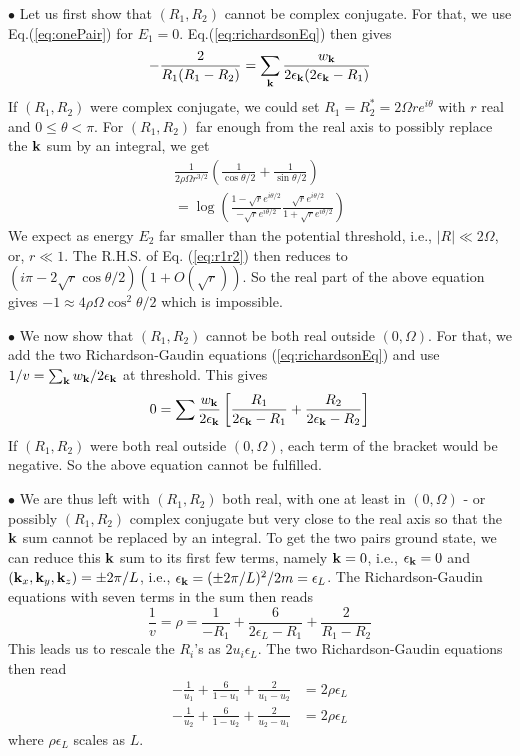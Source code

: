 \documentclass[5p,twocolumn]{elsarticle}
\begin{document}
$\bullet$ Let us first show that $(R_1,R_2)$ cannot be complex conjugate. For that, we use Eq.(\ref{eq:onePair}) for $E_1=0$. Eq.(\ref{eq:richardsonEq}) then gives
\begin{equation}
-\frac{2}{R_{1}(R_{1}-R_{2})}=\sum_{\mathbf{k}}\frac{w_{\mathbf{k}}}{2\epsilon_{\mathbf{k}}(2\epsilon_{\mathbf{k}}-R_{1})}
\end{equation}
If $(R_1,R_2)$ were complex conjugate, we could set $R_1=R^*_2=2 \Omega r e^{i\theta}$ with $r$ real and $0\leqslant\theta<\pi$. For $(R_1,R_2)$ far enough from the real axis to possibly replace the $\mathbf{k}$ sum by an integral, we get
\begin{multline}\label{eq:r1r2}
\frac{1}{2\rho\Omega{r^{3/2}}}\left(\frac{1}{\cos\theta/2}+\frac{1}{\sin\theta/2}\right)\\
=\log\left(\frac{1-\sqrt{r}e^{i\theta/2}}{-\sqrt{r}e^{i\theta/2}}\frac{\sqrt{r}e^{i\theta/2}}{1+\sqrt{r}e^{i\theta/2}}\right)
\end{multline}
We expect as energy $E_{2}$ far smaller than the potential threshold, i.e., $|R|\ll2 \Omega$, or, $r\ll1$. The R.H.S. of Eq. (\ref{eq:r1r2}) then reduces to 
$(i\pi-2\sqrt r\cos\theta/2)(1+O(\sqrt r))$. So the real part of the above equation gives $-1\approx4 \rho \Omega\cos^2\theta/2$ which is impossible.


$\bullet$ We now show that $(R_1,R_2)$ cannot be both real outside $(0,\Omega)$. For that, we add the two Richardson-Gaudin equations (\ref{eq:richardsonEq}) and use $1/v=\sum_{\mathbf{k}}w_{\mathbf{k}}/2\epsilon_{\mathbf{k}}$ at threshold. This gives
\begin{equation}
0=\sum\frac{w_{\mathbf{k}}}{2\epsilon_{\mathbf{k}}}\left[\frac{R_{1}}{2\epsilon_{\mathbf{k}}-R_{1}}+\frac{R_{2}}{2\epsilon_{\mathbf{k}}-R_{2}}\right]
\end{equation}
If $(R_1,R_2)$ were both real outside $(0,\Omega)$, each term of the bracket would be negative. So the above equation cannot be fulfilled.


$\bullet$ We are thus left with $(R_1,R_2)$ both real, with one at least in $(0,\Omega)$ - or possibly $(R_1,R_2)$ complex conjugate but very close to the real axis so that the $\mathbf{k}$ sum cannot be replaced by an integral. To get the two pairs ground state, we can reduce this $\mathbf{k}$ sum to its first few terms, namely $\mathbf{k}=0$, i.e., $\epsilon_{\mathbf{k}}=0$ and
 $(\mathbf{k}_x,\mathbf{k}_y,\mathbf{k}_z)=\pm 2\pi/L
 $, i.e., $\epsilon_{\mathbf{k}}=(\pm 2\pi/L)^2/2m=\epsilon_L$. The Richardson-Gaudin equations with seven terms in the sum then reads
\begin{equation}
\frac{1}{v}=\rho=\frac{1}{-R_{1}}+\frac{6}{2\epsilon_{L}-R_{1}}+\frac{2}{R_{1}-R_{2}}
\end{equation}
This leads us to rescale the $R_i$'s as $2u_i\epsilon_L $. The two Richardson-Gaudin equations then read
\begin{equation}
\begin{split}
-\frac{1}{u_{1}}+\frac{6}{1-u_{1}}+\frac{2}{u_{1}-u_{2}}&=2\rho\epsilon_{L}\\
-\frac{1}{u_{2}}+\frac{6}{1-u_{2}}+\frac{2}{u_{2}-u_{1}}&=2\rho\epsilon_{L}
\end{split}\label{eq:t12}
\end{equation}
where $\rho\epsilon_L$ scales as $L$.
\end{document}
